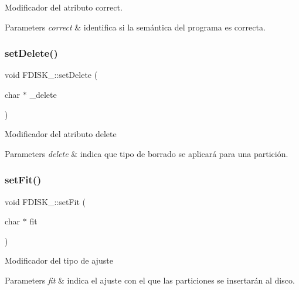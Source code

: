 Modificador del atributo correct. 
\begin{DoxyParams}{Parameters}
{\em correct} & identifica si la semántica del programa es correcta. \\
\hline
\end{DoxyParams}
\mbox{\label{classFDISK___ae5113216c8167ca54b1d5a99d29ed963}} 
\subsubsection{\texorpdfstring{set\+Delete()}{setDelete()}}
{\footnotesize\ttfamily void F\+D\+I\+S\+K\+\_\+\+::set\+Delete (\begin{DoxyParamCaption}\item[{char $\ast$}]{\+\_\+delete }\end{DoxyParamCaption})\hspace{0.3cm}{\ttfamily [inline]}}

Modificador del atributo delete 
\begin{DoxyParams}{Parameters}
{\em delete} & indica que tipo de borrado se aplicará para una partición. \\
\hline
\end{DoxyParams}
\mbox{\label{classFDISK___afb2ab7c0bdd1584aa5cb977de810bdd4}} 
\subsubsection{\texorpdfstring{set\+Fit()}{setFit()}}
{\footnotesize\ttfamily void F\+D\+I\+S\+K\+\_\+\+::set\+Fit (\begin{DoxyParamCaption}\item[{char $\ast$}]{fit }\end{DoxyParamCaption})\hspace{0.3cm}{\ttfamily [inline]}}

Modificador del tipo de ajuste 
\begin{DoxyParams}{Parameters}
{\em fit} & indica el ajuste con el que las particiones se insertarán al disco. \\
\hline
\end{DoxyParams}
\mbox{\label{classFDISK___a28bccf6dd576824e040a29b389c8a650}} 
